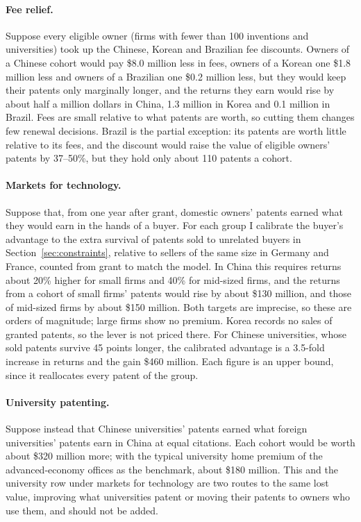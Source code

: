 \paragraph{Fee relief.} Suppose every eligible owner (firms with fewer than 100 inventions and universities) took up
the Chinese, Korean and Brazilian fee discounts. Owners of a Chinese cohort would pay \$8.0 million less in fees,
owners of a Korean one \$1.8 million less and owners of a Brazilian one \$0.2 million less, but they would keep their
patents only marginally longer, and the returns they earn would rise by about half a million dollars in China, 1.3
million in Korea and 0.1 million in Brazil. Fees are small relative to what patents are worth, so cutting them
changes few renewal decisions. Brazil is the partial exception: its patents are worth little relative to its fees,
and the discount would raise the value of eligible owners' patents by 37--50\%, but they hold only about 110 patents
a cohort.

\paragraph{Markets for technology.} Suppose that, from one year after grant, domestic owners' patents earned what they
would earn in the hands of a buyer. For each group I calibrate the buyer's advantage to the extra survival of patents sold to
unrelated buyers in Section~\ref{sec:constraints}, relative to sellers of the same size in Germany and France,
counted from grant to match the model. In China this requires returns about 20\% higher for small firms and 40\% for
mid-sized firms, and the returns from a cohort of small firms' patents would rise by about \$130 million, and those of mid-sized firms by about \$150 million. Both targets are imprecise, so these are orders of magnitude; large firms show no
premium. Korea records no sales of granted patents, so the lever is not priced there. For Chinese universities, whose
sold patents survive 45 points longer, the calibrated advantage is a 3.5-fold increase in returns and the gain
\$460 million. Each figure is an upper bound, since it reallocates every patent of the group.

\paragraph{University patenting.} Suppose instead that Chinese universities' patents earned what foreign
universities' patents earn in China at equal citations. Each cohort would be worth about \$320 million more; with
the typical university home premium of the advanced-economy offices as the benchmark, about \$180 million. This and
the university row under markets for technology are two routes to the same lost value, improving what universities
patent or moving their patents to owners who use them, and should not be added.

